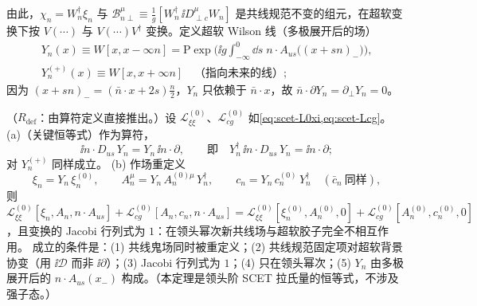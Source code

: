 由此，$\chi_n=W_n^\dagger\xi_n$ 与 $\mathcal B^\mu_{n\perp}\equiv\frac1g[W_n^\dagger\,\ii D^\mu_{\perp c}W_n]$ 是共线规范不变的组元，在超软变换下按 $V(\cdots)$ 与 $V(\cdots)V^\dagger$ 变换。定义超软 Wilson 线（多极展开后的场）
\begin{equation}\label{eq:scet-Yn}
\begin{gathered}
Y_n(x)\equiv W[x,x-\infty n]=\mathrm P\exp\Big(\ii g\int_{-\infty}^0\dd s\;n\cdot A_{us}\big((x+sn)_-\big)\Big),\\
Y_n^{(+)}(x)\equiv W[x,x+\infty n]\quad\text{（指向未来的线）};
\end{gathered}
\end{equation}
因为 $(x+sn)_-=(\bar n\cdot x+2s)\frac n2$，$Y_n$ 只依赖于 $\bar n\cdot x$，故 $\bar n\cdot\partial Y_n=\partial_\perp Y_n=0$。

\begin{theorem}\label{thm:scet-decoupling}
（$R_{\mathrm{def}}$：由算符定义直接推出。）设 $\mathcal L^{(0)}_{\xi\xi}$、$\mathcal L^{(0)}_{cg}$ 如\cref{eq:scet-L0xi,eq:scet-Lcg}。
(a)（关键恒等式）作为算符，
\begin{equation}\label{eq:scet-key}
\ii n\cdot D_{us}\,Y_n=Y_n\,\ii n\cdot\partial,\qquad\text{即}\quad Y_n^\dagger\,\ii n\cdot D_{us}\,Y_n=\ii n\cdot\partial ;
\end{equation}
对 $Y_n^{(+)}$ 同样成立。
(b) 作场重定义
\begin{equation}\label{eq:scet-BPS}
\xi_n=Y_n\,\xi_n^{(0)},\qquad A_n^\mu=Y_n\,A_n^{(0)\mu}\,Y_n^\dagger,\qquad c_n=Y_n\,c_n^{(0)}\,Y_n^\dagger\quad(\bar c_n\ \text{同样}),
\end{equation}
则 $\mathcal L^{(0)}_{\xi\xi}[\xi_n,A_n,n\cdot A_{us}]+\mathcal L^{(0)}_{cg}[A_n,c_n,n\cdot A_{us}]=\mathcal L^{(0)}_{\xi\xi}[\xi^{(0)}_n,A^{(0)}_n,0]+\mathcal L^{(0)}_{cg}[A^{(0)}_n,c^{(0)}_n,0]$，且变换的 Jacobi 行列式为 $1$：在领头幂次新共线场与超软胶子完全不相互作用。
成立的条件是：(1) 共线鬼场同时被重定义；(2) 共线规范固定项对超软背景协变（用 $\ii\mathcal D$ 而非 $\ii\partial$）；(3) Jacobi 行列式为 $1$；(4) 只在领头幂次；(5) $Y_n$ 由多极展开后的 $n\cdot A_{us}(x_-)$ 构成。（本定理是领头阶 SCET 拉氏量的恒等式，不涉及强子态。）
\end{theorem}

